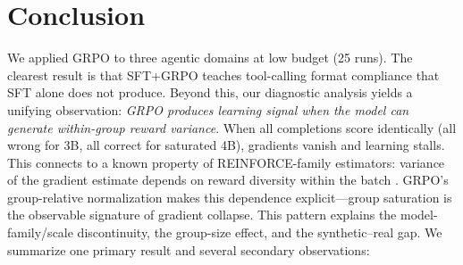 \documentclass{article}
\begin{document}
\section{Conclusion}

We applied GRPO to three agentic domains at low budget (25 runs). The clearest result is that SFT+GRPO teaches tool-calling format compliance that SFT alone does not produce. Beyond this, our diagnostic analysis yields a unifying observation: \emph{GRPO produces learning signal when the model can generate within-group reward variance}. When all completions score identically (all wrong for 3B, all correct for saturated 4B), gradients vanish and learning stalls. This connects to a known property of REINFORCE-family estimators: variance of the gradient estimate depends on reward diversity within the batch \citep{williams1992simple}. GRPO's group-relative normalization makes this dependence explicit---group saturation is the observable signature of gradient collapse. This pattern explains the model-family/scale discontinuity, the group-size effect, and the synthetic--real gap. We summarize one primary result and several secondary observations:
\end{document}
